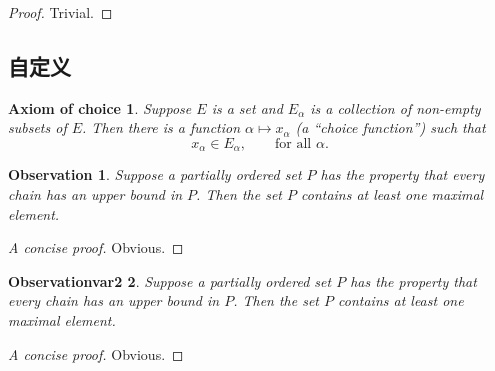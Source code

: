 \begin{proof}
	Trivial.
\end{proof}


\subsection{自定义}

\newtheorem*{axiomofchoice}{Axiom of choice}
\begin{axiomofchoice}
	Suppose $E$ is a set and ${E_\alpha}$ is a collection of
	non-empty subsets of $E$. Then there is a function $\alpha
	\mapsto x_\alpha$ (a ``choice function'') such that
	\begin{equation}
	x_\alpha \in E_\alpha,\qquad \text{for all }\alpha.
	\end{equation}
\end{axiomofchoice}

\newtheorem{observation}{Observation}[chapter]
\begin{observation}
	Suppose a partially ordered set $P$ has the property
	that every chain has an upper bound in $P$. Then the
	set $P$ contains at least one maximal element.
\end{observation}
\begin{proof}[A concise proof]
	Obvious.
\end{proof}

\newtheorem{observationvar2}[observation]{Observationvar2}
\begin{observationvar2}
	Suppose a partially ordered set $P$ has the property
	that every chain has an upper bound in $P$. Then the
	set $P$ contains at least one maximal element.
\end{observationvar2}
\begin{proof}[A concise proof]
	Obvious.
\end{proof}